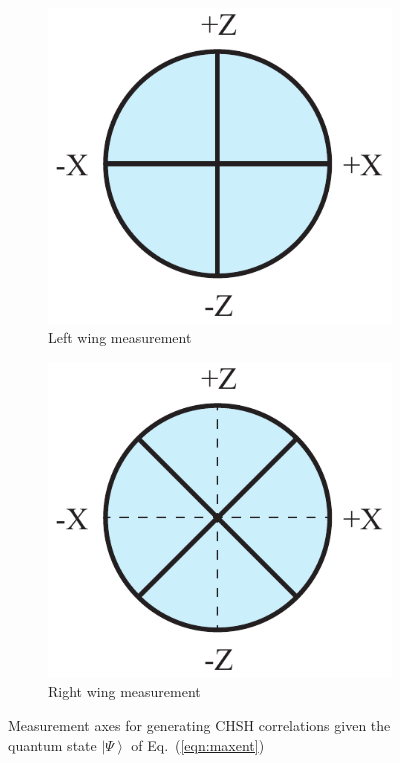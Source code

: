 \documentclass[letterpaper,onecolumn,nofootinbib]{revtex4}
\begin{document}
\begin{figure}[h]
	        \begin{subfigure}[b]{0.18\textwidth}
                	\centering
                	\includegraphics[width=\textwidth]{alice}
		\caption{Left wing measurement}
		\label{fig:alice-chsh}
	\end{subfigure}
        \hspace{8em}
        \begin{subfigure}[b]{0.18\textwidth}
                	\centering
                	\includegraphics[width=\textwidth]{bob-chsh}
             	\caption{Right wing measurement}
                	\label{fig:bob-chsh}
        \end{subfigure}
 \caption{Measurement axes for generating CHSH correlations given the quantum state $\left\vert \Psi \right\rangle$ of Eq.~(\ref{eqn:maxent})}
\label{fig:chsh-meas}
\end{figure}
\end{document}

